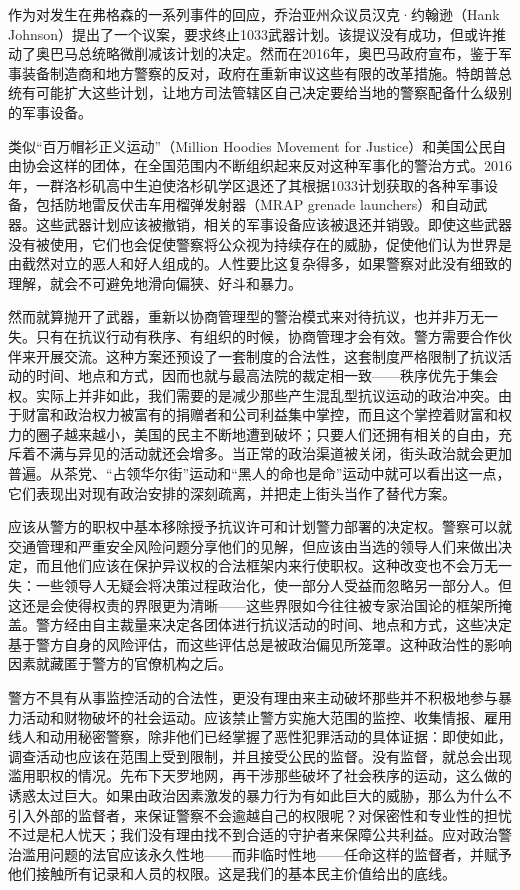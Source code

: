 \documentclass[fontset=fandol, a4paper, 12pt, openright]{ctexbook}
\begin{document}
作为对发生在弗格森的一系列事件的回应，乔治亚州众议员汉克·约翰逊（Hank Johnson）提出了一个议案，要求终止1033武器计划。该提议没有成功，但或许推动了奥巴马总统略微削减该计划的决定。然而在2016年，奥巴马政府宣布，鉴于军事装备制造商和地方警察的反对，政府在重新审议这些有限的改革措施。特朗普总统有可能扩大这些计划，让地方司法管辖区自己决定要给当地的警察配备什么级别的军事设备。

类似“百万帽衫正义运动”（Million Hoodies Movement for Justice）和美国公民自由协会这样的团体，在全国范围内不断组织起来反对这种军事化的警治方式。2016年，一群洛杉矶高中生迫使洛杉矶学区退还了其根据1033计划获取的各种军事设备，包括防地雷反伏击车用榴弹发射器（MRAP grenade launchers）和自动武器。这些武器计划应该被撤销，相关的军事设备应该被退还并销毁。即使这些武器没有被使用，它们也会促使警察将公众视为持续存在的威胁，促使他们认为世界是由截然对立的恶人和好人组成的。人性要比这复杂得多，如果警察对此没有细致的理解，就会不可避免地滑向偏狭、好斗和暴力。

然而就算抛开了武器，重新以协商管理型的警治模式来对待抗议，也并非万无一失。只有在抗议行动有秩序、有组织的时候，协商管理才会有效。警方需要合作伙伴来开展交流。这种方案还预设了一套制度的合法性，这套制度严格限制了抗议活动的时间、地点和方式，因而也就与最高法院的裁定相一致——秩序优先于集会权。实际上并非如此，我们需要的是减少那些产生混乱型抗议运动的政治冲突。由于财富和政治权力被富有的捐赠者和公司利益集中掌控，而且这个掌控着财富和权力的圈子越来越小，美国的民主不断地遭到破坏；只要人们还拥有相关的自由，充斥着不满与异见的活动就还会增多。当正常的政治渠道被关闭，街头政治就会更加普遍。从茶党、“占领华尔街”运动和“黑人的命也是命”运动中就可以看出这一点，它们表现出对现有政治安排的深刻疏离，并把走上街头当作了替代方案。

应该从警方的职权中基本移除授予抗议许可和计划警力部署的决定权。警察可以就交通管理和严重安全风险问题分享他们的见解，但应该由当选的领导人们来做出决定，而且他们应该在保护异议权的合法框架内来行使职权。这种改变也不会万无一失：一些领导人无疑会将决策过程政治化，使一部分人受益而忽略另一部分人。但这还是会使得权责的界限更为清晰——这些界限如今往往被专家治国论的框架所掩盖。警方经由自主裁量来决定各团体进行抗议活动的时间、地点和方式，这些决定基于警方自身的风险评估，而这些评估总是被政治偏见所笼罩。这种政治性的影响因素就藏匿于警方的官僚机构之后。

警方不具有从事监控活动的合法性，更没有理由来主动破坏那些并不积极地参与暴力活动和财物破坏的社会运动。应该禁止警方实施大范围的监控、收集情报、雇用线人和动用秘密警察，除非他们已经掌握了恶性犯罪活动的具体证据：即使如此，调查活动也应该在范围上受到限制，并且接受公民的监督。没有监督，就总会出现滥用职权的情况。先布下天罗地网，再干涉那些破坏了社会秩序的运动，这么做的诱惑太过巨大。如果由政治因素激发的暴力行为有如此巨大的威胁，那么为什么不引入外部的监督者，来保证警察不会逾越自己的权限呢？对保密性和专业性的担忧不过是杞人忧天；我们没有理由找不到合适的守护者来保障公共利益。应对政治警治滥用问题的法官应该永久性地——而非临时性地——任命这样的监督者，并赋予他们接触所有记录和人员的权限。这是我们的基本民主价值给出的底线。
\end{document}
